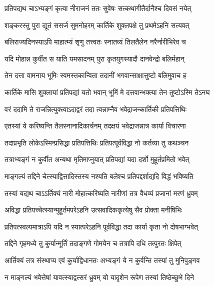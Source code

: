 


\twolineshloka
{प्रतिपद्यथ चाऽभ्यङ्गं कृत्वा नीराजनं ततः}
{सुवेषः सत्कथागीतैर्दानैश्च दिवसं नयेत्} %

\twolineshloka
{शङ्करस्तु पुरा द्यूतं ससर्ज सुमनोहरम्}
{कार्तिके शुक्लपक्षे तु प्रथमेऽहनि सत्यवत्} %

\twolineshloka
{बलिराज्यदिनस्याऽपि माहात्म्यं शृणु तत्त्वतः}
{स्नातव्यं तिलतैलेन नरैर्नारीभिरेव च} %

\twolineshloka
{यदि मोहान्न कुर्वीत स याति यमसादनम्}
{पुरा कृतयुगस्यादौ दानवेन्द्रो बलिर्महान्} %

\twolineshloka
{तेन दत्ता वामनाय भूमिः स्वमस्तकान्विता}
{तदानीं भगवान्साक्षात्तुष्टो बलिमुवाच ह} %

\twolineshloka
{कार्तिके मासि शुक्लायां प्रतिपद्यां यतो भवान्}
{भूमिं मे दत्तवान्भक्त्या तेन तुष्टोऽस्मि तेऽनघ} %

\twolineshloka
{वरं ददामि ते राजन्नित्युक्त्वाऽदाद्वरं तदा}
{त्वन्नाम्नैव भवेद्राजन्कार्तिकी प्रतिपत्तिथिः} %

\twolineshloka
{एतस्यां ये करिष्यन्ति तैलस्नानादिकार्चनम्}
{तदक्षयं भवेद्राजन्नात्र कार्या विचारणा} %

\twolineshloka
{तदाप्रभृति लोकेऽस्मिन्प्रसिद्धा प्रतिपत्तिथिः}
{प्रतिपत्पूर्वविद्धा नो कर्तव्या तु कथञ्चन} %

\twolineshloka
{तत्राभ्यङ्गं न कुर्वीत अन्यथा मृतिमाप्नुयात्}
{प्रतिपद्यां यदा दर्शो मुहूर्तप्रमितो भवेत्} %

\twolineshloka
{माङ्गल्यं तद्दिने चेत्स्याद्वित्तादिस्तस्य नश्यति}
{बलेश्च प्रतिपद्दर्शाद्यदि विद्धं भविष्यति} %

\twolineshloka
{तस्यां यद्यथ चाऽऽर्तिक्यं नारी मोहात्करिष्यति}
{नारीणां तत्र वैधव्यं प्रजानां मरणं ध्रुवम्} %

\twolineshloka
{अविद्धा प्रतिपच्चेत्स्यान्मुहूर्तमपरेऽहनि}
{उत्सवादिककृत्येषु सैव प्रोक्ता मनीषिभिः} %

\twolineshloka
{प्रतिपत्स्वल्पमात्राऽपि यदि न स्यात्परेऽहनि}
{पूर्वविद्धा तदा कार्या कृता नो दोषभाग्भवेत्} %

\twolineshloka
{तद्दिने गृहमध्ये तु कुर्यान्मूर्तिं तदाङ्गणे}
{गोमयेन च तत्रापि दधि तत्पुरतः क्षिपेत्} %

\twolineshloka
{आर्तिक्यं तत्र संस्थाप्य एवं कुर्याद्विधानतः}
{अभ्यङ्गं ये न कुर्वन्ति तस्यां तु मुनिपुङ्गव} %

\twolineshloka
{न माङ्गल्यं भवेत्तेषां यावत्स्याद्वत्सरं ध्रुवम्}
{यो यादृशेन रूपेण तस्यां तिष्ठेच्छुभे दिने} %

